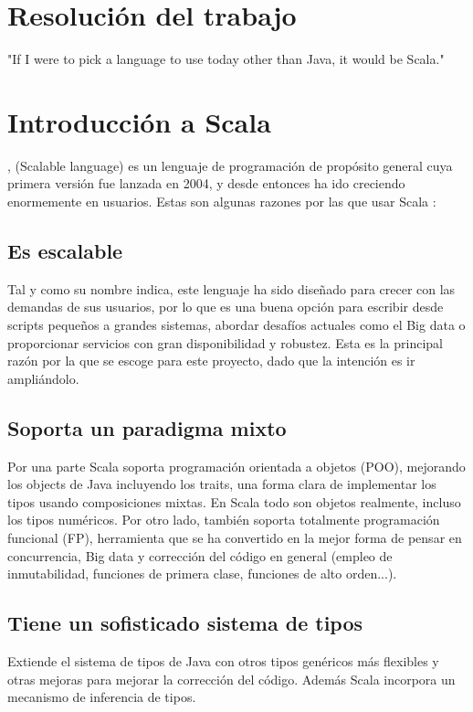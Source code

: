 \chapter*{Resolución del trabajo}
\begin{savequote}[75mm]
"If I were to pick a language to use today other than Java, it would be Scala."
\end{savequote}

\chapter{Introducción a Scala}
, (Scalable language) es un lenguaje de programación de propósito general cuya primera versión fue lanzada en 2004, y desde entonces ha ido creciendo enormemente en usuarios. Estas son algunas razones por las que usar Scala \citet{9781491949856}:
\section*{Es escalable} Tal y como su nombre indica, este lenguaje ha sido diseñado para crecer con las demandas de sus usuarios, por lo que es una buena opción para escribir desde scripts pequeños a grandes sistemas, abordar desafíos actuales como el Big data o proporcionar servicios con gran disponibilidad y robustez. Esta es la principal razón por la que se escoge para este proyecto, dado que la intención es ir ampliándolo.

\section*{Soporta un paradigma mixto} Por una parte \textsf{Scala} soporta programación orientada a objetos (POO), mejorando los objects de Java incluyendo los \textsf{traits}, una forma clara de implementar los tipos usando composiciones mixtas. En \textsf{Scala} todo son objetos realmente, incluso los tipos numéricos. Por otro lado, también soporta totalmente programación funcional (FP),
herramienta que se ha convertido en la mejor forma de pensar en concurrencia, Big data y corrección del código en general (empleo de inmutabilidad, funciones de primera clase, funciones de alto orden...). 

\section*{Tiene un sofisticado sistema de tipos} Extiende el sistema de tipos de Java con otros tipos genéricos más flexibles y otras mejoras para mejorar la corrección del código. Además \textsf{Scala} incorpora un mecanismo de inferencia de tipos.
